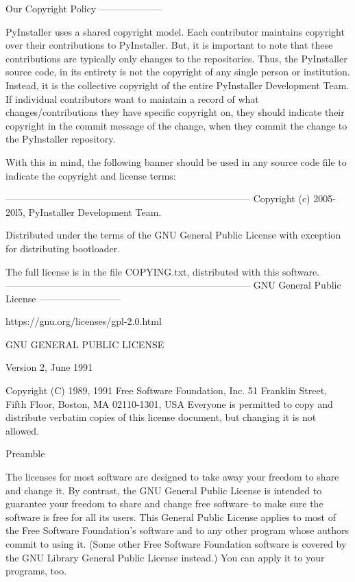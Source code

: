 Our Copyright Policy\newline
--------------------

PyInstaller uses a shared copyright model. Each contributor maintains copyright
over their contributions to PyInstaller. But, it is important to note that these
contributions are typically only changes to the repositories. Thus,
the PyInstaller source code, in its entirety is not the copyright of any single
person or institution.  Instead, it is the collective copyright of the entire
PyInstaller Development Team.  If individual contributors want to maintain
a record of what changes/contributions they have specific copyright on, they
should indicate their copyright in the commit message of the change, when they
commit the change to the PyInstaller repository.

With this in mind, the following banner should be used in any source code file
to indicate the copyright and license terms:

-----------------------------------------------------------------------------\newline
Copyright (c) 2005-20l5, PyInstaller Development Team.

Distributed under the terms of the GNU General Public License with exception
for distributing bootloader.

The full license is in the file COPYING.txt, distributed with this software.\newline
-----------------------------------------------------------------------------
\newpage
GNU General Public License\newline
--------------------------

https://gnu.org/licenses/gpl-2.0.html

\begin{center}
	GNU GENERAL PUBLIC LICENSE
	
	Version 2, June 1991
\end{center}

Copyright (C) 1989, 1991 Free Software Foundation, Inc.
51 Franklin Street, Fifth Floor, Boston, MA  02110-1301, USA
Everyone is permitted to copy and distribute verbatim copies
of this license document, but changing it is not allowed.

\begin{center}
	Preamble
\end{center}

The licenses for most software are designed to take away your
freedom to share and change it.  By contrast, the GNU General Public
License is intended to guarantee your freedom to share and change free
software--to make sure the software is free for all its users.  This
General Public License applies to most of the Free Software
Foundation's software and to any other program whose authors commit to
using it.  (Some other Free Software Foundation software is covered by
the GNU Library General Public License instead.)  You can apply it to
your programs, too.

